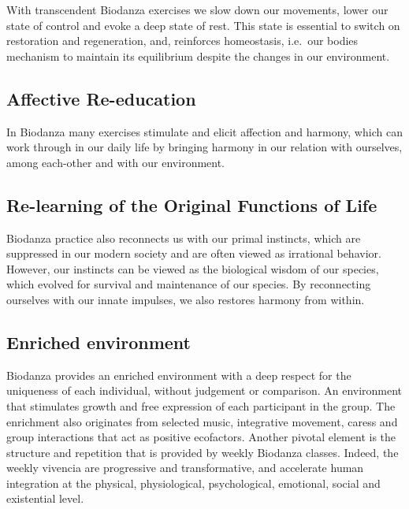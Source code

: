 \documentclass[
  11pt,
]{book}
\begin{document}
With transcendent Biodanza exercises we slow down our movements, lower our state of control and evoke a deep state of rest. This state is essential to switch on restoration and regeneration, and, reinforces homeostasis, i.e.~our bodies mechanism to maintain its equilibrium despite the changes in our environment.

\hypertarget{affective-re-education}{%
\subsection{Affective Re-education}\label{affective-re-education}}

In Biodanza many exercises stimulate and elicit affection and harmony, which can work through in our daily life by bringing harmony in our relation with ourselves, among each-other and with our environment.

\hypertarget{re-learning-of-the-original-functions-of-life}{%
\subsection{Re-learning of the Original Functions of Life}\label{re-learning-of-the-original-functions-of-life}}

Biodanza practice also reconnects us with our primal instincts, which are suppressed in our modern society and are often viewed as irrational behavior.
However, our instincts can be viewed as the biological wisdom of our species, which evolved for survival and maintenance of our species. By reconnecting ourselves with our innate impulses, we also restores harmony from within.

\hypertarget{enriched-environment}{%
\subsection{Enriched environment}\label{enriched-environment}}

Biodanza provides an enriched environment with a deep respect for the uniqueness of each individual, without judgement or comparison. An environment that stimulates growth and free expression of each participant in the group. The enrichment also originates from selected music, integrative movement, caress and group interactions that act as positive ecofactors. Another pivotal element is the structure and repetition that is provided by weekly Biodanza classes. Indeed, the weekly vivencia are progressive and transformative, and accelerate human integration at the physical, physiological, psychological, emotional, social and existential level.
\end{document}
